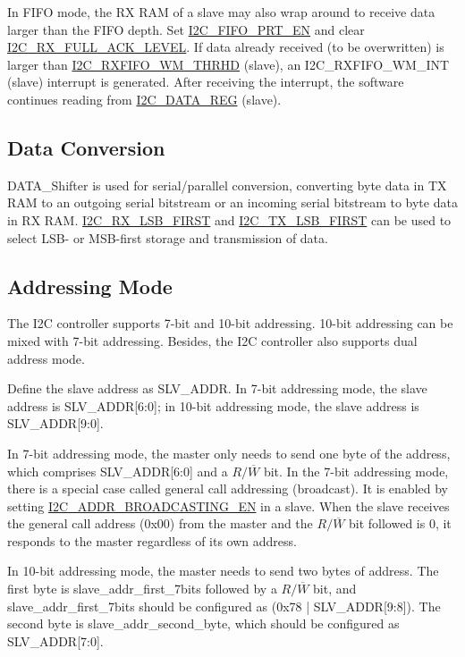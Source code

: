 \documentclass[main\_\_EN.tex]{subfiles}
\begin{document}
In FIFO mode, the RX RAM of a slave may also wrap around to receive data larger than the FIFO depth. Set \hyperref[fielddesc:I2CFIFOPRTEN]{I2C\_FIFO\_PRT\_EN} and clear \hyperref[fielddesc:I2CRXFULLACKLEVEL]{I2C\_RX\_FULL\_ACK\_LEVEL}. If data already received (to be overwritten) is larger than \hyperref[fielddesc:I2CRXFIFOWMTHRHD]{I2C\_RXFIFO\_WM\_THRHD} (slave), an I2C\_RXFIFO\_WM\_INT (slave) interrupt is generated. After receiving the interrupt, the software continues reading from \hyperref[regdesc:I2CDATAREG]{I2C\_DATA\_REG} (slave).

\subsection{Data Conversion}
DATA\_Shifter is used for serial/parallel conversion, converting byte data in TX RAM to an outgoing serial bitstream or an incoming serial bitstream to byte data in RX RAM. \hyperref[fielddesc:I2CRXLSBFIRST]{I2C\_RX\_LSB\_FIRST} and \hyperref[fielddesc:I2CTXLSBFIRST]{I2C\_TX\_LSB\_FIRST} can be used to select LSB- or MSB-first storage and transmission of data.

\subsection{Addressing Mode}
The \chipname{} I2C controller supports 7-bit and 10-bit addressing. 10-bit addressing can be mixed with 7-bit addressing. Besides, the \chipname{} I2C controller also supports dual address mode.

Define the slave address as SLV\_ADDR. In 7-bit addressing mode, the slave address is SLV\_ADDR[6:0]; in 10-bit addressing mode, the slave address is SLV\_ADDR[9:0].

In 7-bit addressing mode, the master only needs to send one byte of the address, which comprises SLV\_ADDR[6:0] and a $R/\overline W$ bit. In the 7-bit addressing mode, there is a special case called general call addressing (broadcast). It is enabled by setting \hyperref[fielddesc:I2CADDRBROADCASTINGEN]{I2C\_ADDR\_BROADCASTING\_EN} in a slave. When the slave receives the general call address (0x00) from the master and the $R/\overline W$ bit followed is 0, it responds to the master regardless of its own address.

In 10-bit addressing mode, the master needs to send two bytes of address. The first byte is slave\_addr\_first\_7bits followed by a $R/\overline W$ bit, and slave\_addr\_first\_7bits should be configured as (0x78 | SLV\_ADDR[9:8]). The second byte is slave\_addr\_second\_byte, which should be configured as SLV\_ADDR[7:0].
\end{document}
